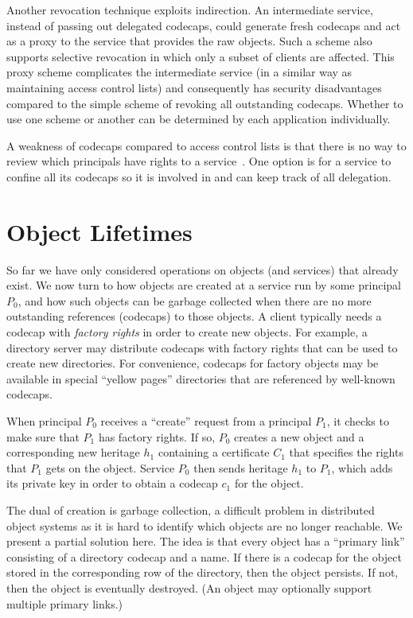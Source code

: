 \documentclass[10pt, conference, compsocconf]{IEEEtran}
\begin{document}
Another revocation technique exploits indirection.  An intermediate service,
instead of passing out delegated codecaps, could generate fresh codecaps
and act as a proxy to the service that provides the raw objects.
Such a scheme also supports selective revocation
in which only a subset of clients are affected.  
This proxy scheme complicates the intermediate service (in a similar
way as maintaining access control lists) and consequently
has security disadvantages compared to the simple scheme of revoking
all outstanding codecaps.  Whether to use one scheme or another can be
determined by each application individually.

A weakness of codecaps compared to access control lists is that there is no
way to review which principals have rights to a service~\cite{Gli79}.
One option is for a service to confine all its codecaps so it is
involved in and can keep track of all delegation.

\section{Object Lifetimes}

So far we have only considered operations on objects (and services)
that already exist.
We now turn to how objects are created at a service run by some
principal $P_0$, and
how such objects can be garbage collected when there are no more
outstanding references (codecaps) to those objects.
A client typically needs a codecap with \emph{factory rights}
in order to create new objects.  For example, a directory server
may distribute codecaps with factory rights that can be used
to create new directories.
For convenience, codecaps for factory objects may be available in special
``yellow pages'' directories that are referenced by well-known codecaps.

When principal $P_0$ receives a ``create'' request from a principal $P_1$,
it checks to make sure that $P_1$ has factory rights.  If so, $P_0$ creates
a new object and a corresponding new heritage $h_1$ containing a
certificate $C_1$ that specifies the rights that $P_1$ gets on the object.
Service $P_0$ then sends heritage $h_1$ to $P_1$, which adds its private
key in order to obtain a codecap $c_1$ for the object.

The dual of creation is garbage collection, a difficult problem in
distributed object systems as it is hard to identify which objects are
no longer reachable.
We present a partial solution here.  The idea is that
every object has a ``primary link'' consisting of a directory codecap and
a name.  If there is a codecap for the object stored in the corresponding row
of the directory, then the object persists.
If not, then the object is eventually destroyed.
(An object may optionally support multiple primary links.)
\end{document}
